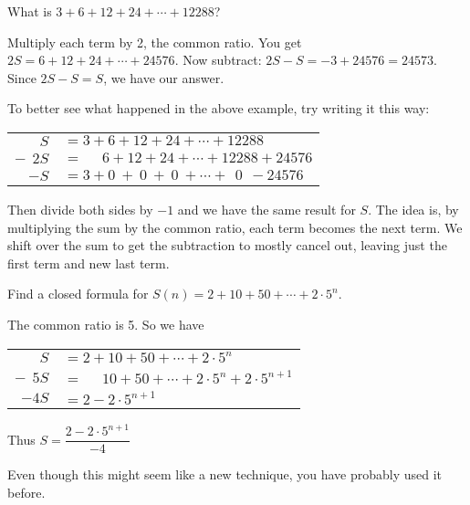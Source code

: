 \documentclass[12pt]{article}
\begin{document}
\begin{example} What is $3 + 6 + 12 + 24 + \cdots + 12288$?
\begin{solution}
  Multiply each term by 2, the common ratio.  You get $2S = 6 + 12 + 24 + \cdots + 24576$.   Now subtract: $2S - S = -3 + 24576 = 24573$.  Since $2S - S = S$, we have our answer.
  \end{solution}
\end{example}

To better see what happened in the above example, try writing it this way:

\begin{center}
\begin{tabular}{rl}
  $S $& $= 3 + 6 + 12 + 24 + \cdots + 12288$ \\
 $-~~2S$ & $= ~~~~~~6 + 12 + 24 + \cdots + 12288 + 24576 $\\ \hline
 $-S$ &$ = 3 + 0 ~+~ 0 ~+~ 0 ~ +  \cdots + ~~0 ~~ - 24576$
\end{tabular}
\end{center}

Then divide both sides by $-1$ and we have the same result for $S$.  The idea is, by multiplying the sum by the common ratio, each term becomes the next term.  We shift over the sum to get the subtraction to mostly cancel out, leaving just the first term and new last term.

\begin{example}
  Find a closed formula for $S(n) = 2 + 10 + 50 + \cdots + 2\cdot 5^n$.
  \begin{solution}
    The common ratio is 5.  So we have

    \begin{center}
\begin{tabular}{rl}
  $S $& $= 2 + 10 + 50 + \cdots + 2\cdot 5^n$ \\
 $-~~5S$ & $= ~~~~~~10 + 50 + \cdots + 2\cdot 5^n + 2\cdot5^{n+1} $\\ \hline
 $-4S$ &$ = 2  - 2\cdot5^{n+1}$
\end{tabular}
\end{center}

Thus $S = \dfrac{2-2\cdot 5^{n+1}}{-4}$
  \end{solution}
\end{example}

Even though this might seem like a new technique, you have probably used it before.
\end{document}
